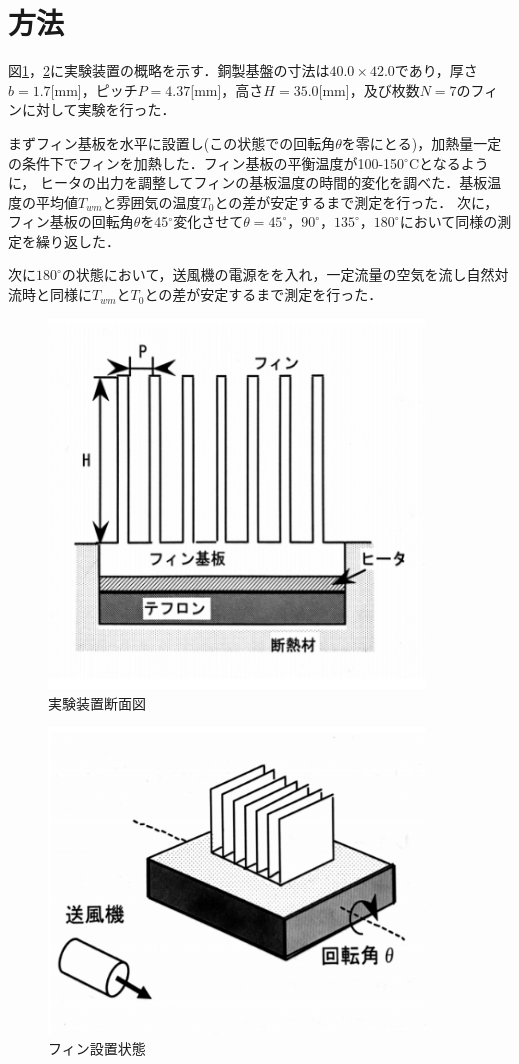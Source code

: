 \documentclass[a4paper,11pt,uplatex]{jsarticle}
\begin{document}
\section{方法}
図\ref{実験装置断面図}，\ref{フィン設置状態}に実験装置の概略を示す．銅製基盤の寸法は$40.0 \times 42.0$であり，厚さ$b=1.7$[mm]，ピッチ$P=4.37$[mm]，高さ$H=35.0$[mm]，及び枚数$N=7$のフィンに対して実験を行った．
\par
まずフィン基板を水平に設置し(この状態での回転角$\theta$を零にとる)，加熱量一定の条件下でフィンを加熱した．フィン基板の平衡温度が100-150$^\circ$Cとなるように，
ヒータの出力を調整してフィンの基板温度の時間的変化を調べた．基板温度の平均値$T_{wm}$と雰囲気の温度$T_0$との差が安定するまで測定を行った．
次に，フィン基板の回転角$\theta$を45$^\circ$変化させて$\theta=45^\circ，90^\circ，135^\circ，180^\circ$において同様の測定を繰り返した．
\par
次に$180^\circ$の状態において，送風機の電源をを入れ，一定流量の空気を流し自然対流時と同様に$T_{wm}$と$T_0$との差が安定するまで測定を行った．
\begin{figure}[H]
  \begin{center}
    \includegraphics[width = 10cm]{画像/fig1.png}
    \caption{実験装置断面図}
    \label{実験装置断面図}
  \end{center}
\end{figure}
\begin{figure}[H]
  \begin{center}
    \includegraphics[width = 10cm]{画像/fig2.png}
    \caption{フィン設置状態}
    \label{フィン設置状態}
  \end{center}
\end{figure}
\end{document}
